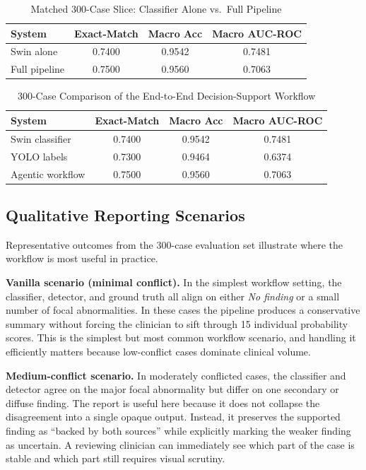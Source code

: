 \documentclass[conference]{IEEEtran}
\begin{document}
\begin{table}[t]
\caption{Matched 300-Case Slice: Classifier Alone vs.\ Full Pipeline}
\label{tab:agentic_focus}
\centering
\scriptsize
\setlength{\tabcolsep}{4pt}
\begin{tabular}{lccc}
\toprule
System & Exact-Match & Macro Acc & Macro AUC-ROC \\
\midrule
Swin alone & 0.7400 & 0.9542 & 0.7481 \\
Full pipeline & 0.7500 & 0.9560 & 0.7063 \\
\bottomrule
\end{tabular}
\end{table}

\begin{table}[t]
\caption{300-Case Comparison of the End-to-End Decision-Support Workflow}
\label{tab:agentic}
\centering
\scriptsize
\setlength{\tabcolsep}{4pt}
\begin{tabular}{lccc}
\toprule
System & Exact-Match & Macro Acc & Macro AUC-ROC \\
\midrule
Swin classifier & 0.7400 & 0.9542 & 0.7481 \\
YOLO labels & 0.7300 & 0.9464 & 0.6374 \\
Agentic workflow & 0.7500 & 0.9560 & 0.7063 \\
\bottomrule
\end{tabular}
\end{table}

\subsection{Qualitative Reporting Scenarios}
Representative outcomes from the 300-case evaluation set illustrate where the workflow is most useful in practice.

\noindent\textbf{Vanilla scenario (minimal conflict).}
In the simplest workflow setting, the classifier, detector, and ground truth all align on either \textit{No finding} or a small number of focal abnormalities. In these cases the pipeline produces a conservative summary without forcing the clinician to sift through 15 individual probability scores. This is the simplest but most common workflow scenario, and handling it efficiently matters because low-conflict cases dominate clinical volume.

\medskip
\noindent\textbf{Medium-conflict scenario.}
In moderately conflicted cases, the classifier and detector agree on the major focal abnormality but differ on one secondary or diffuse finding. The report is useful here because it does not collapse the disagreement into a single opaque output. Instead, it preserves the supported finding as ``backed by both sources'' while explicitly marking the weaker finding as uncertain. A reviewing clinician can immediately see which part of the case is stable and which part still requires visual scrutiny.
\end{document}
